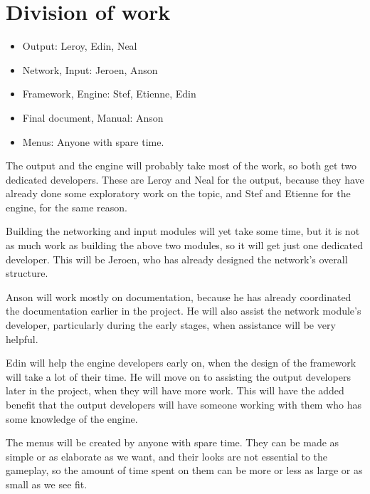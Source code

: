 \documentclass[a4paper,twoside,11pt]{article}
\begin{document}
\newpage
\section{Division of work}

\begin{itemize}

  \item Output: Leroy, Edin, Neal

  \item Network, Input: Jeroen, Anson

  \item Framework, Engine: Stef, Etienne, Edin

  \item Final document, Manual: Anson

  \item Menus: Anyone with spare time.

\end{itemize}

The output and the engine will probably take most of the work, so both get two dedicated developers. These are Leroy and Neal for the output, because they have already done some exploratory work on the topic, and Stef and Etienne for the engine, for the same reason.

Building the networking and input modules will yet take some time, but it is not as much work as building the above two modules, so it will get just one dedicated developer. This will be Jeroen, who has already designed the network's overall structure.

Anson will work mostly on documentation, because he has already coordinated the documentation earlier in the project. He will also assist the network module's developer, particularly during the early stages, when assistance will be very helpful.

Edin will help the engine developers early on, when the design of the framework will take a lot of their time. He will move on to assisting the output developers later in the project, when they will have more work. This will have the added benefit that the output developers will have someone working with them who has some knowledge of the engine.

The menus will be created by anyone with spare time. They can be made as simple or as elaborate as we want, and their looks are not essential to the gameplay, so the amount of time spent on them can be more or less as large or as small as we see fit.
\end{document}
